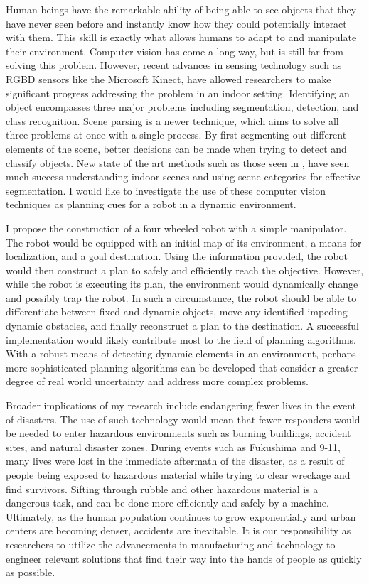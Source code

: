 \documentclass[10pt]{article}
\begin{document}
Human beings have the remarkable ability of being able to see objects that they
have never seen before and instantly know how they could potentially interact
with them. This skill is exactly what allows humans to adapt to and manipulate
their environment. Computer vision has come a long way, but is still far from
solving this problem. However, recent advances in sensing technology such as
RGBD sensors like the Microsoft Kinect, have allowed researchers to make
significant progress addressing the problem in an indoor setting. Identifying
an object encompasses three major problems including segmentation, detection,
and class recognition. Scene parsing is a newer technique, which aims to solve
all three problems at once with a single process. By first segmenting out
different elements of the scene, better decisions can be made when trying to
detect and classify objects. New state of the art methods such as those seen in
\cite{gupta}, have seen much success understanding indoor scenes and using
scene categories for effective segmentation. I would like to investigate the
use of these computer vision techniques as planning cues for a robot in a
dynamic environment.

I propose the construction of a four wheeled robot with a simple manipulator.
The robot would be equipped with an initial map of its environment, a means for
localization, and a goal destination. Using the information provided, the robot
would then construct a plan to safely and efficiently reach the objective.
However, while the robot is executing its plan, the environment would
dynamically change and possibly trap the robot.  In such a circumstance, the
robot should be able to differentiate between fixed and dynamic objects, move
any identified impeding dynamic obstacles, and finally reconstruct a plan to
the destination. A successful implementation would likely contribute most to
the field of planning algorithms. With a robust means of detecting dynamic
elements in an environment, perhaps more sophisticated planning algorithms can
be developed that consider a greater degree of real world uncertainty and
address more complex problems.

Broader implications of my research include endangering fewer lives in the
event of disasters. The use of such technology would mean that fewer responders
would be needed to enter hazardous environments such as burning buildings,
accident sites, and natural disaster zones. During events such as Fukushima and
9-11, many lives were lost in the immediate aftermath of the disaster, as a
result of people being exposed to hazardous material while trying to clear
wreckage and find survivors. Sifting through rubble and other hazardous
material is a dangerous task, and can be done more efficiently and safely by a
machine. Ultimately, as the human population continues to grow exponentially
and urban centers are becoming denser, accidents are inevitable.  It is
our responsibility as researchers to utilize the advancements in manufacturing
and technology to engineer relevant solutions that find their way into the
hands of people as quickly as possible.
\end{document}
